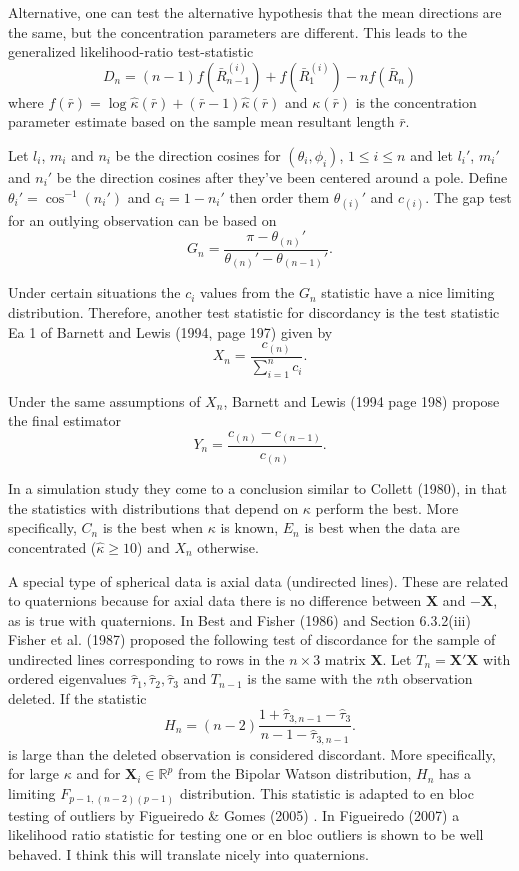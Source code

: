\documentclass{article}\usepackage[]{graphicx}\usepackage[]{color}
\newcommand{\R}{{\mathbb{R}}}
\begin{document}
Alternative, one can test the alternative hypothesis that the mean directions are the same, but the concentration parameters are different.  This leads to the generalized likelihood-ratio test-statistic
\[
D_n=(n-1)f(\bar{R}_{n-1}^{(i)})+f(\bar{R}_1^{(i)})-nf(\bar{R}_n)
\]
where $f(\bar{r})=\log\hat\kappa(\bar{r})+(\bar{r}-1)\hat\kappa(\bar{r})$ and $\kappa(\bar{r})$ is the concentration parameter estimate based on the sample mean resultant length $\bar{r}$.

Let $l_i$, $m_i$ and $n_i$ be the direction cosines for $(\theta_i,\phi_i)$, $1\leq i\leq n$ and let $l_i'$, $m_i'$ and $n_i'$ be the direction cosines after they've been centered around a pole.  Define $\theta_i'=\cos^{-1}(n_i')$ and $c_i=1-n_i'$ then order them $\theta_{(i)}'$ and $c_{(i)}$.  The gap test for an outlying observation can be based on
\[
G_n=\frac{\pi-\theta_{(n)}'}{\theta_{(n)}'-\theta_{(n-1)}'}.
\]

Under certain situations the $c_i$ values from the $G_n$ statistic have a nice limiting distribution.  Therefore, another test statistic for discordancy is the test statistic Ea 1 of Barnett and Lewis (1994, page 197) \cite{barnett1994} given by
\[
X_n=\frac{c_{(n)}}{\sum_{i=1}^nc_i}.
\]

Under the same assumptions of $X_n$, Barnett and Lewis (1994 page 198) propose the final estimator
\[
Y_n=\frac{c_{(n)}-c_{(n-1)}}{c_{(n)}}.
\]

In a simulation study they come to a conclusion similar to Collett (1980), in that the statistics with distributions that depend on $\kappa$ perform the best.  More specifically, $C_n$ is the best when $\kappa$ is known, $E_n$ is best when the data are concentrated ($\hat{\kappa}\geq 10$) and $X_n$ otherwise.

A special type of spherical data is axial data (undirected lines).  These are related to quaternions because for axial data there is no difference between $\bm X$ and $-\bm X$, as is true with quaternions.  In Best and Fisher (1986) \cite{best1986} and Section 6.3.2(iii) Fisher et al. (1987) \cite{fisher1987} proposed the following test of discordance for the sample of undirected lines corresponding to rows in the $n\times 3$ matrix $\bm X$.  Let $T_n=\bm X'\bm X$ with ordered eigenvalues $\hat\tau_1,\hat\tau_2,\hat\tau_3$ and $T_{n-1}$ is the same with the $n$th observation deleted.  If the statistic
\[
H_n=(n-2)\frac{1+\hat\tau_{3,n-1}-\hat\tau_3}{n-1-\hat\tau_{3,n-1}}.
\]
is large than the deleted observation is considered discordant.  More specifically, for large $\kappa$ and for $\bm X_i\in \R^p$ from the Bipolar Watson distribution, $H_n$ has a limiting $F_{p-1,(n-2)(p-1)}$ distribution.  This statistic is adapted to en bloc testing of outliers by Figueiredo \& Gomes (2005) \cite{figueiredo2005}.  In Figueiredo (2007) \cite{figueiredo2007} a likelihood ratio statistic for testing one or en bloc outliers is shown to be well behaved.  I think this will translate nicely into quaternions.
\end{document}

